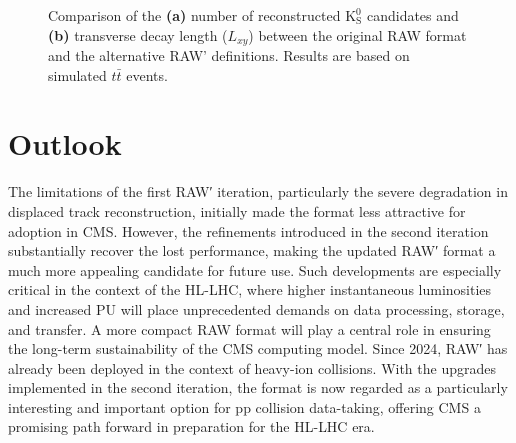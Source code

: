 \begin{figure}[!htbp]
    \caption[Reconstruction of $\mathrm{K}_\mathrm{S}^0$ candidates and $L_{xy}$ for RAW and RAW']{Comparison of the \textbf{(a)} number of reconstructed $\mathrm{K}_\mathrm{S}^0$ candidates and \textbf{(b)} transverse decay length ($L_{xy}$) between the original RAW format and the alternative RAW' definitions. Results are based on simulated $t\bar{t}$ events.}
    \label{Figure:Chapter5_KsReconstruction}
\end{figure}

\section{Outlook}

The limitations of the first RAW′ iteration, particularly the severe degradation in displaced track reconstruction, initially made the format less attractive for adoption in CMS. However, the refinements introduced in the second iteration substantially recover the lost performance, making the updated RAW′ format a much more appealing candidate for future use. Such developments are especially critical in the context of the \ac{HL}-\ac{LHC}, where higher instantaneous luminosities and increased \ac{PU} will place unprecedented demands on data processing, storage, and transfer. A more compact RAW format will play a central role in ensuring the long-term sustainability of the CMS computing model. Since 2024, RAW′ has already been deployed in the context of heavy-ion collisions. With the upgrades implemented in the second iteration, the format is now regarded as a particularly interesting and important option for pp collision data-taking, offering CMS a promising path forward in preparation for the \ac{HL}-\ac{LHC} era.